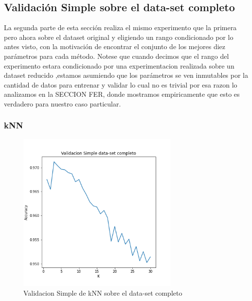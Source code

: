 \documentclass[a4paper,10pt]{article}
\begin{document}
\subsection{Validación Simple sobre el data-set completo}

La segunda parte de esta sección realiza el mismo experimento que la primera pero ahora sobre el dataset original y eligiendo un rango condicionado por lo antes visto, con la motivación de encontrar el conjunto de los mejores diez parámetros para cada método. Notese que cuando decimos que el rango del experimento estara condicionado por una experimentacion realizada sobre un dataset reducido ,estamos asumiendo que los parámetros se ven inmutables por la cantidad de datos para entrenar y validar lo cual no es trivial por esa razon lo analizamos en la SECCION FER, donde mostramos empiricamente que esto es verdadero para nuestro caso particular.


\subsubsection{kNN}


\begin{figure}[H]
    \centering
    \includegraphics[width=8cm]{../images/validacionSimple_datasetCompleto.png}%
    \qquad
    \caption{Validacion Simple de kNN sobre el data-set completo}
    \label{knn_valSimple}%
\end{figure}
\end{document}
